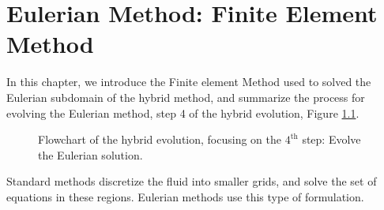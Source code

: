 \chapter{Eulerian Method: Finite Element Method}
\label{ch:eulerian}

%	


In this chapter, we introduce the Finite element Method used to solved the Eulerian subdomain of the hybrid method, and summarize the process for evolving the Eulerian method, step 4 of the hybrid evolution, Figure \ref{fig:flowchart_simpleCoupling_Eulerian}.

	\begin{figure}[!h]
		\centering
		\caption{Flowchart of the hybrid evolution, focusing on the $4^{\mathrm{th}}$ step: Evolve the Eulerian solution.}
		\label{fig:flowchart_simpleCoupling_Eulerian}
	\end{figure}

Standard  methods discretize the fluid into smaller grids, and solve the set of  equations in these regions. Eulerian methods use this type of formulation.


